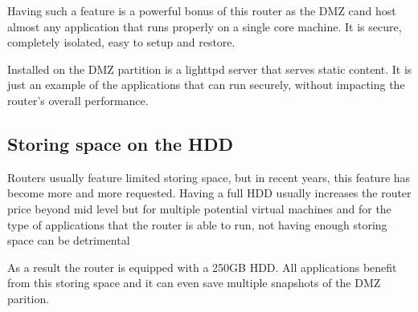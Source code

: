 Having such a feature is a powerful bonus of this router as the DMZ cand
host almost any application that runs properly on a single core machine.
It is secure, completely isolated, easy to setup and restore.

Installed on the DMZ partition is a lighttpd server that serves static
content. It is just an example of the applications that can run securely,
without impacting the router's overall performance.

\subsection{Storing space on the HDD}
\label{sub-sec:storing}
Routers usually feature limited storing space, but in recent years, this
feature has become more and more requested. Having a full HDD usually
increases the router price beyond mid level but for multiple potential
virtual machines and for the type of applications that the router
is able to run, not having enough storing space can be detrimental

As a result the router is equipped with a 250GB HDD. All applications
benefit from this storing space and it can even save multiple snapshots of
the DMZ parition.
